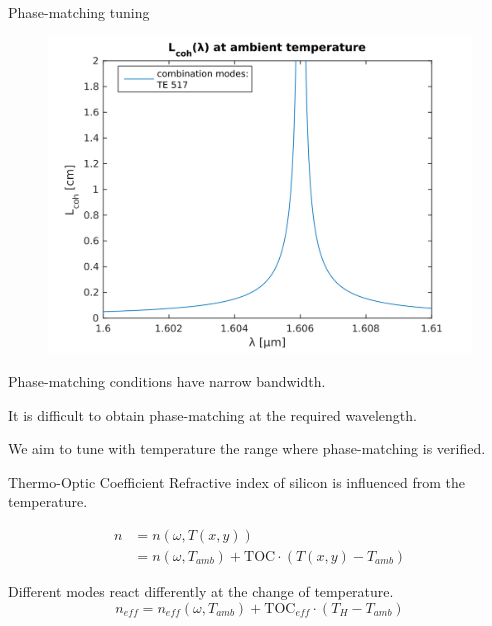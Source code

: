\documentclass[11pt, leqno]{beamer}
\begin{document}
\begin{frame}{Phase-matching tuning}
	\begin{figure}
		\centering
	    \includegraphics[width=.6\textwidth]{narrow_bandwidth.png}
	\end{figure}
	Phase-matching conditions have narrow bandwidth.
	
	\vspace{20pt}
	It is difficult to obtain phase-matching at the required wavelength.
	
	\vspace{20pt}
	We aim to tune with temperature the range where phase-matching is verified.
\end{frame}
\begin{frame}{Thermo-Optic Coefficient}
	Refractive index of silicon is influenced from the temperature.
	
	\begin{equation}
	\begin{split}
		n 	&= n(\omega,T(x,y)) \\
			&= n(\omega,T_{amb}) + \mathrm{TOC}\cdot(T(x,y)-T_{amb})
		\label{eq_refractive_index}
	\end{split}
	\end{equation}
	
	\vspace{10pt}
	Different modes react differently at the change of temperature.
	\begin{equation}
		n_{eff} = n_{eff}(\omega,T_{amb}) + \mathrm{TOC}_{eff}\cdot(T_H-T_{amb})
		\label{eq_effective_index}
	\end{equation}
\end{frame}
\end{document}

